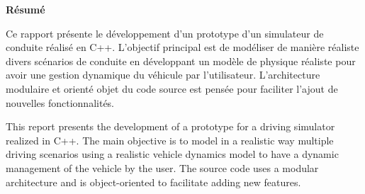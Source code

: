 \documentclass[a4paper,12pt]{report}
\begin{document}
    \clearpage
    \vspace*{\fill}
    \begin{center}
    {\Large \textbf{Résumé}}
    \end{center}
    \bigskip
    \noindent
    \begin{minipage}{\textwidth}
        Ce rapport présente le développement d'un prototype d'un simulateur de conduite réalisé en C++.
        L'objectif principal est de modéliser de manière réaliste divers scénarios de conduite en développant un modèle de physique réaliste pour avoir une gestion dynamique du véhicule par l'utilisateur.
        L'architecture modulaire et orienté objet du code source est pensée pour faciliter l'ajout de nouvelles fonctionnalités.

        \bigskip

        This report presents the development of a prototype for a driving simulator realized in C++.
        The main objective is to model in a realistic way multiple driving scenarios using a realistic vehicle dynamics model to have a dynamic management of the vehicle by the user.
        The source code uses a modular architecture and is object-oriented to facilitate adding new features.
    \end{minipage}
    \vspace*{\fill} %
    \clearpage
\end{document}

